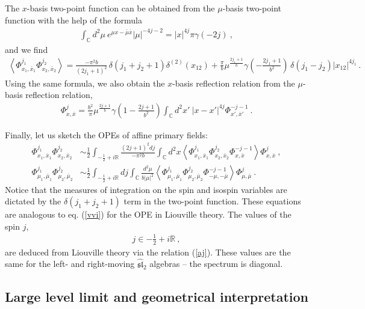 \documentclass[12pt,a4paper,notitlepage]{report}
\newcommand \la {\left\langle}
\newcommand \ra {\right\rangle}
\newcommand \C {\mathbb{C}}
\numberwithin{equation}{section}
\theoremstyle{break}
\begin{document}
The $x$-basis two-point function can be obtained from the $\mu$-basis two-point function with the help of the formula 
\begin{align}
 \int_{\C}d^2\mu\ e^{\mu x-\bar{\mu}\bar{x}} |\mu|^{-4j-2} = |x|^{4j}\pi \gamma(-2j) \ ,
\end{align}
and we find 
\begin{align}
 \la \Phi^{j_1}_{x_1,\bar{x}_1} \Phi^{j_2}_{x_2,\bar{x}_2} \ra = \frac{-\pi^2 b}{(2j_1+1)^2}\, \delta(j_1+j_2+1)\delta^{(2)}(x_{12}) 
+ \frac{\pi}{b}\mu^{\frac{2j_1+1}{b}} \gamma(-\tfrac{2j_1+1}{b^2})\, \delta(j_1-j_2)|x_{12}|^{4j_1}\, .
\label{pjpj}
\end{align}
Using the same formula, we also obtain the $x$-basis reflection relation from the $\mu$-basis reflection relation,
\begin{align}
 \Phi^j_{x,\bar{x}} = \frac{b^2}{\pi}\mu^{\frac{2j+1}{b}}\gamma(1-\tfrac{2j+1}{b^2})\int_{\C}d^2x'\ |x-x'|^{4j}\Phi^{-j-1}_{x',\bar{x}'}\ .
\end{align}

Finally, let us sketch the OPEs of affine primary fields:
\begin{align}
 \Phi^{j_1}_{x_1,\bar{x}_1}\Phi^{j_2}_{x_2,\bar{x}_2} &\sim \frac12 \int_{-\frac12 + i\mathbb{R}} \frac{(2j+1)^2 dj}{-\pi^2b}\int_{\C}d^2x \la \Phi^{j_1}_{x_1,\bar{x}_1}\Phi^{j_2}_{x_2,\bar{x}_2} \Phi^{-j-1}_{x,\bar{x}} \ra \Phi^j_{x,\bar{x}}\ ,
\label{xope}
\\
\Phi^{j_1}_{\mu_1,\bar{\mu}_1}\Phi^{j_2}_{\mu_2,\bar{\mu}_2} &\sim \frac12 \int_{-\frac12 + i\mathbb{R}} dj\int_{\C}\frac{d^2\mu}{b|\mu|^2} \la \Phi^{j_1}_{\mu_1,\bar{\mu}_1}\Phi^{j_2}_{\mu_2,\bar{\mu}_2} \Phi^{-j-1}_{-\mu,-\bar{\mu}} \ra \Phi^j_{\mu,\bar{\mu}}\ .
\label{mope}
\end{align}
Notice that the measures of integration on the spin and isospin variables are dictated by the $\delta(j_1+j_2+1)$ term in the two-point function.
These equations are analogous to eq. (\ref{vvi}) for the OPE in Liouville theory. The values of the spin $j$,
\begin{align}
 \boxed{j\in -\frac12 + i\mathbb{R}}\ , 
\end{align}
 are deduced from Liouville theory via the relation (\ref{aj}). These values are the same for the left- and right-moving $\widehat{\mathfrak{sl}}_2$ algebras -- the spectrum is diagonal.


\subsection{Large level limit and geometrical interpretation}
\end{document}
